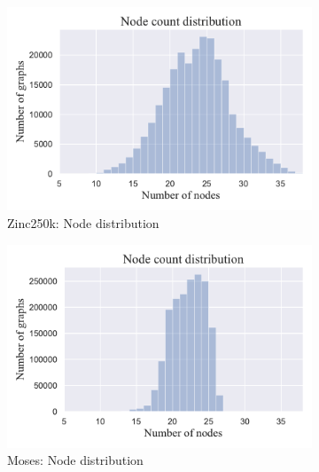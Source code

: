 \begin{figure}
    \centering
    \begin{subfigure}{0.49\textwidth}
       \centering
       \includegraphics[width=\linewidth]{figures/experiments_figures/dataset_figures/zinc250k/zinc250k_node_distribution.pdf}
       \caption{Zinc250k: Node distribution}
    \end{subfigure}
    \hfill
    \begin{subfigure}{0.49\textwidth}
       \centering
       \includegraphics[width=\linewidth]{figures/experiments_figures/dataset_figures/moses/moses_node_distribution.pdf}
       \caption{Moses: Node distribution}
    \end{subfigure}
    \begin{subfigure}{0.49\textwidth}
       \centering

\end{subfigure}
\end{figure}

